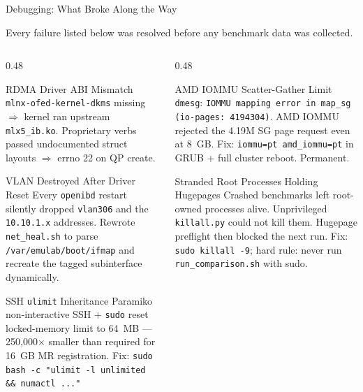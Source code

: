 \documentclass[aspectratio=169,8pt]{beamer}
\newcommand{\sys}[1]{\texttt{#1}}
\begin{document}
\begin{frame}{Debugging: What Broke Along the Way}

{\small Every failure listed below was resolved before any benchmark data was collected.}

\vspace{0.5em}
\begin{columns}[T,onlytextwidth]
\begin{column}{0.48\textwidth}

\begin{block}{RDMA Driver ABI Mismatch}
\small \sys{mlnx-ofed-kernel-dkms} missing $\Rightarrow$ kernel ran upstream \sys{mlx5\_ib.ko}. Proprietary verbs passed undocumented struct layouts $\Rightarrow$ errno 22 on QP create.
\end{block}

\vspace{0.3em}
\begin{block}{VLAN Destroyed After Driver Reset}
\small Every \sys{openibd} restart silently dropped \sys{vlan306} and the \texttt{10.10.1.x} addresses. Rewrote \sys{net\_heal.sh} to parse \sys{/var/emulab/boot/ifmap} and recreate the tagged subinterface dynamically.
\end{block}

\vspace{0.3em}
\begin{block}{SSH \texttt{ulimit} Inheritance}
\small Paramiko non-interactive SSH + \sys{sudo} reset locked-memory limit to 64~MB — 250,000$\times$ smaller than required for 16~GB MR registration. Fix: \sys{sudo bash -c "ulimit -l unlimited \&\& numactl ..."}
\end{block}

\end{column}
\begin{column}{0.48\textwidth}

\begin{block}{AMD IOMMU Scatter-Gather Limit}
\small \texttt{dmesg}: \texttt{IOMMU mapping error in map\_sg (io-pages: 4194304)}. AMD IOMMU rejected the 4.19M SG page request even at 8~GB. Fix: \sys{iommu=pt amd\_iommu=pt} in GRUB + full cluster reboot. Permanent.
\end{block}

\vspace{0.3em}
\begin{block}{Stranded Root Processes Holding Hugepages}
\small Crashed benchmarks left root-owned processes alive. Unprivileged \sys{killall.py} could not kill them. Hugepage preflight then blocked the next run. Fix: \sys{sudo killall -9}; hard rule: never run \sys{run\_comparison.sh} with sudo.
\end{block}


\end{column}
\end{columns}
\end{frame}
\end{document}
